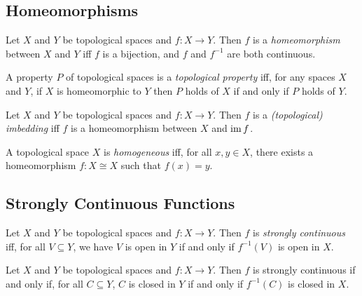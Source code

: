 \subsection{Homeomorphisms}

\begin{df}[Homeomorphism]
  Let $X$ and $Y$ be topological spaces and $f : X \rightarrow Y$. Then $f$
  is
  a
  \emph{homeomorphism} between $X$ and $Y$ iff $f$ is a bijection, and $f$
  and
  $f^{-1}$ are both continuous.
\end{df}

\begin{df}
  A property $P$ of topological spaces is a \emph{topological property} iff,
  for any spaces $X$ and $Y$, if $X$ is homeomorphic to $Y$ then $P$ holds of
  $X$
  if and only if $P$ holds of $Y$.
\end{df}

\begin{df}
  Let $X$ and $Y$ be topological spaces and $f : X \rightarrow Y$. Then $f$
  is
  a
  \emph{(topological) imbedding} iff $f$ is a homeomorphism between $X$ and
  $\operatorname{im} f$.
\end{df}

\begin{df}[Homogeneous]
  A topological space $X$ is \emph{homogeneous} iff, for all $x, y \in X$,
  there exists a homeomorphism $f : X \cong X$ such that $f(x) = y$.
\end{df}


\subsection{Strongly Continuous Functions}

\begin{df}
  Let $X$ and $Y$ be topological spaces and $f : X \rightarrow Y$. Then $f$
  is
  \emph{strongly continuous} iff, for all $V \subseteq Y$, we have $V$ is
  open
  in $Y$ if and only if $f^{-1}(V)$ is open in $X$.
\end{df}

\begin{prop}
  \label{prop:topology:strongly_continuous:closed}
  Let $X$ and $Y$ be topological spaces and $f : X \rightarrow Y$. Then $f$
  is
  strongly continuous if and only if, for all $C \subseteq Y$, $C$ is closed
  in
  $Y$ if and only if $f^{-1}(C)$ is closed in $X$.
\end{prop}


